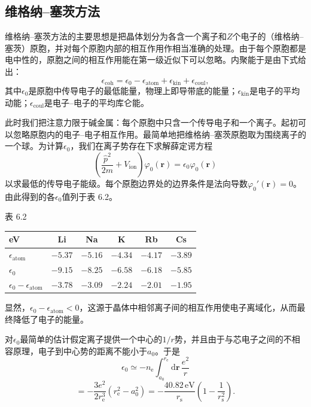 \subsection{维格纳–塞茨方法}

维格纳–塞茨方法的主要思想是把晶体划分为各含一个离子和$Z$个电子的（维格纳–塞茨）原胞，并对每个原胞内部的相互作用作相当准确的处理。由于每个原胞都是电中性的，原胞之间的相互作用能在第一级近似下可以忽略。内聚能于是由下式给出：
\begin{equation*}
\epsilon_{\mathrm{coh}} = \epsilon_0 - \epsilon_{\mathrm{atom}} + \epsilon_{\mathrm{kin}} + \epsilon_{\mathrm{coul}},
\tag{6.24}
\end{equation*}
其中$\epsilon_0$是原胞中传导电子的最低能量，物理上即导带底的能量；$\epsilon_{\mathrm{kin}}$是电子的平均动能；$\epsilon_{\mathrm{coul}}$是电子–电子的平均库仑能。

此时我们把注意力限于碱金属：每个原胞中只含一个传导电子和一个离子。起初可以忽略原胞内的电子–电子相互作用。最简单地把维格纳–塞茨原胞取为围绕离子的一个球。为计算$\epsilon_0$，我们在离子势存在下求解薛定谔方程
\begin{equation*}
\left(\frac{\hat{p}^2}{2m} + V_{\mathrm{ion}}\right)\varphi_0(\mathbf{r}) = \epsilon_0\varphi_0(\mathbf{r})
\tag{6.25}
\end{equation*}
以求最低的传导电子能级。每个原胞边界处的边界条件是法向导数$\varphi_0'(\mathbf{r}) = 0$。由此得到的各$\epsilon_0$值列于表 6.2。

\begin{center}
表 6.2\\[4pt]
\begin{tabular}{lccccc}
\toprule
eV & Li & Na & K & Rb & Cs\\
\midrule
$\epsilon_{\mathrm{atom}}$ & $-5.37$ & $-5.16$ & $-4.34$ & $-4.17$ & $-3.89$\\
$\epsilon_0$ & $-9.15$ & $-8.25$ & $-6.58$ & $-6.18$ & $-5.85$\\
$\epsilon_0 - \epsilon_{\mathrm{atom}}$ & $-3.78$ & $-3.09$ & $-2.24$ & $-2.01$ & $-1.95$\\
\bottomrule
\end{tabular}
\end{center}

显然，$\epsilon_0 - \epsilon_{\mathrm{atom}} < 0$，这源于晶体中相邻离子间的相互作用使电子离域化，从而最终降低了电子的能量。

对$\epsilon_0$最简单的估计假定离子提供一个中心的$1/r$势，并且由于与芯电子之间的不相容原理，电子到中心势的距离不能小于$a_0$。于是
\begin{equation*}
\epsilon_0 \simeq -n_{\mathrm{e}}\int_{a_0}^{r_{\mathrm{e}}} \mathrm{d}\mathbf{r}\,\frac{e^2}{r}
\tag{6.26}
\end{equation*}
\begin{equation*}
= -\frac{3e^2}{2r_{\mathrm{e}}^3}\left(r_{\mathrm{e}}^2 - a_0^2\right) = -\frac{40.82\,\mathrm{eV}}{r_{\mathrm{s}}}\left(1 - \frac{1}{r_{\mathrm{s}}^2}\right).
\tag{6.27}
\end{equation*}

